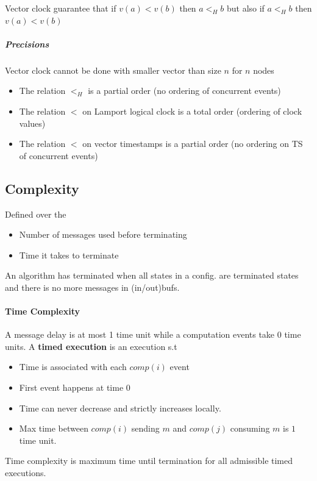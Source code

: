 Vector clock guarantee that if $v(a) < v(b)$ then $a <_H b$ but also if
$a <_H b$ then $v(a) < v(b)$

\subparagraph{Precisions}
Vector clock cannot be done with smaller vector than size $n$ for $n$ nodes
\begin{itemize}
	\item The relation $<_H$ is a partial order (no ordering of concurrent events)
	\item The relation $<$ on Lamport logical clock is a total order (ordering of clock values)
	\item The relation $<$ on vector timestamps is a partial order (no ordering on TS of concurrent events)
\end{itemize}

\subsection{Complexity}
Defined over the
\begin{itemize}
	\item Number of messages used before terminating
	\item Time it takes to terminate
\end{itemize}
An algorithm has terminated when all states in a config. are terminated
states and there is no more messages in (in/out)bufs.\\
\paragraph{Time Complexity}
A message delay is at most 1 time unit while a computation events take
0 time units. A \textbf{timed execution} is an execution s.t
\begin{itemize}
	\item Time is associated with each $comp(i)$ event
	\item First event happens at time $0$
	\item Time can never decrease and strictly increases locally.
	\item Max time between $comp(i)$ sending $m$ and $comp(j)$
	consuming $m$ is $1$ time unit.
\end{itemize}
Time complexity is maximum time until termination for all
admissible timed executions.
